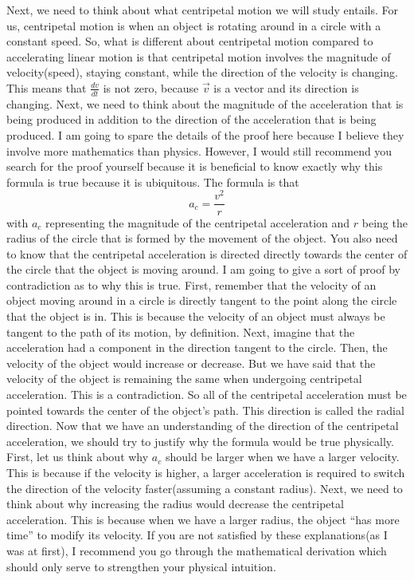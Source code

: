 \documentclass{article}[gray]
\numberwithin{equation}{subsection}
\begin{document}
Next, we need to think about what centripetal motion we will study entails. For us, centripetal motion is when an object is rotating around in a circle with a constant speed. So, what is different about centripetal motion compared to accelerating linear motion is that centripetal motion involves the magnitude of velocity(speed), staying constant, while the direction of the velocity is changing. This means that $\frac{dv}{dt}$ is not zero, because $\vec{v}$ is a vector and its direction is changing. Next, we need to think about the magnitude of the acceleration that is being produced in addition to the direction of the acceleration that is being produced. I am going to spare the details of the proof here because I believe they involve more mathematics than physics. However, I would still recommend you search for the proof yourself because it is beneficial to know exactly why this formula is true because it is ubiquitous. The formula is that \begin{equation}a_c=\frac{v^2}{r}\end{equation} with $a_c$ representing the magnitude of the centripetal acceleration and $r$ being the radius of the circle that is formed by the movement of the object. You also need to know that the centripetal acceleration is directed directly towards the center of the circle that the object is moving around. I am going to give a sort of proof by contradiction as to why this is true. First, remember that the velocity of an object moving around in a circle is directly tangent to the point along the circle that the object is in. This is because the velocity of an object must always be tangent to the path of its motion, by definition. Next, imagine that the acceleration had a component in the direction tangent to the circle. Then, the velocity of the object would increase or decrease. But we have said that the velocity of the object is remaining the same when undergoing centripetal acceleration. This is a contradiction. So all of the centripetal acceleration must be pointed towards the center of the object's path. This direction is called the radial direction. Now that we have an understanding of the direction of the centripetal acceleration, we should try to justify why the formula would be true physically. First, let us think about why $a_c$ should be larger when we have a larger velocity. This is because if the velocity is higher, a larger acceleration is required to switch the direction of the velocity faster(assuming a constant radius). Next, we need to think about why increasing the radius would decrease the centripetal acceleration. This is because when we have a larger radius, the object “has more time” to modify its velocity. If you are not satisfied by these explanations(as I was at first), I recommend you go through the mathematical derivation which should only serve to strengthen your physical intuition. 
\end{document}
